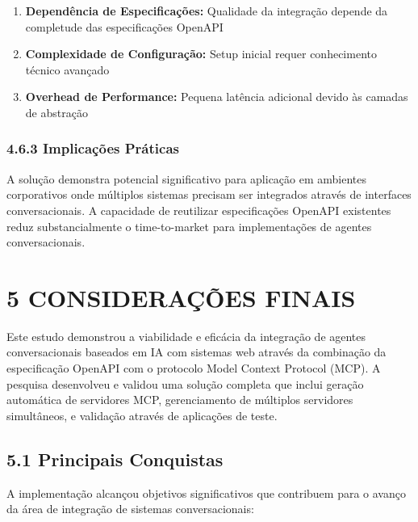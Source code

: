 \documentclass[
]{article}
\providecommand{\tightlist}{%
  \setlength{\itemsep}{0pt}\setlength{\parskip}{0pt}}
\begin{document}
\begin{enumerate}
\def\labelenumi{\arabic{enumi}.}
\tightlist
\item
  \textbf{Dependência de Especificações:} Qualidade da integração
  depende da completude das especificações OpenAPI
\item
  \textbf{Complexidade de Configuração:} Setup inicial requer
  conhecimento técnico avançado
\item
  \textbf{Overhead de Performance:} Pequena latência adicional devido às
  camadas de abstração
\end{enumerate}

\subsubsection{4.6.3 Implicações
Práticas}\label{implicauxe7uxf5es-pruxe1ticas}

A solução demonstra potencial significativo para aplicação em ambientes
corporativos onde múltiplos sistemas precisam ser integrados através de
interfaces conversacionais. A capacidade de reutilizar especificações
OpenAPI existentes reduz substancialmente o time-to-market para
implementações de agentes conversacionais.

\section{5 CONSIDERAÇÕES FINAIS}\label{considerauxe7uxf5es-finais}

Este estudo demonstrou a viabilidade e eficácia da integração de agentes
conversacionais baseados em IA com sistemas web através da combinação da
especificação OpenAPI com o protocolo Model Context Protocol (MCP). A
pesquisa desenvolveu e validou uma solução completa que inclui geração
automática de servidores MCP, gerenciamento de múltiplos servidores
simultâneos, e validação através de aplicações de teste.

\subsection{5.1 Principais Conquistas}\label{principais-conquistas}

A implementação alcançou objetivos significativos que contribuem para o
avanço da área de integração de sistemas conversacionais:
\end{document}
